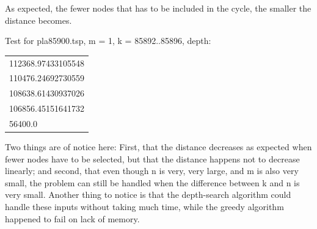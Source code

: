 As expected, the fewer nodes that has to be included in the cycle,
the smaller the distance becomes.

Test for pla85900.tsp, m = 1, k = 85892..85896, depth:

\begin{tabular}{|l|}
   112368.97433105548 \\
   110476.24692730559 \\
   108638.61430937026 \\
   106856.45151641732 \\
   56400.0 \\
\end{tabular}

Two things are of notice here: First, that the distance decreases as expected when
fewer nodes have to be selected, but that the distance happens not to decrease linearly;
and second, that even though n is very, very large, and m is also very small, the problem
can still be handled when the difference between k and n is very small.
Another thing to notice is that the depth-search algorithm could handle these inputs
without taking much time, while the greedy algorithm happened to fail on lack of memory.

